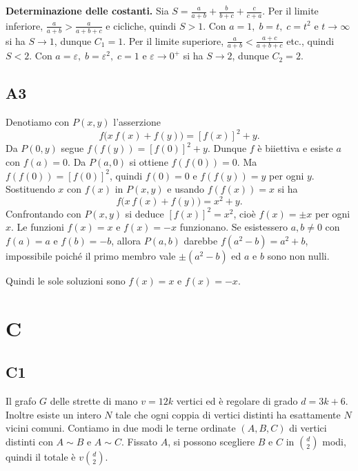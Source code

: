 \documentclass[11pt]{scrartcl}
\begin{document}
\textbf{Determinazione delle costanti.} Sia $S=\frac{a}{a+b}+\frac{b}{b+c}+\frac{c}{c+a}$.
Per il limite inferiore, $\frac{a}{a+b}>\frac{a}{a+b+c}$ e cicliche, quindi $S>1$.
Con $a=1,\;b=t,\;c=t^2$ e $t\to\infty$ si ha $S\to1$, dunque $C_1=1$.
Per il limite superiore, $\frac{a}{a+b}<\frac{a+c}{a+b+c}$ etc., quindi $S<2$.
Con $a=\varepsilon,\;b=\varepsilon^2,\;c=1$ e $\varepsilon\to0^+$ si ha $S\to2$, dunque $C_2=2$.



\subsection{A3}

Denotiamo con $P(x,y)$ l'asserzione
\[
f\bigl(x\,f(x)+f(y)\bigr)=[f(x)]^2+y.
\]
Da $P(0,y)$ segue $f(f(y))=[f(0)]^2+y$. Dunque $f$ è biiettiva e esiste $a$ con $f(a)=0$.
Da $P(a,0)$ si ottiene $f(f(0))=0$. Ma $f(f(0))=[f(0)]^2$, quindi $f(0)=0$ e $f(f(y))=y$ per ogni $y$.
Sostituendo $x$ con $f(x)$ in $P(x,y)$ e usando $f(f(x))=x$ si ha
\[
f\bigl(x\,f(x)+f(y)\bigr)=x^2+y.
\]
Confrontando con $P(x,y)$ si deduce $[f(x)]^2=x^2$, cioè $f(x)=\pm x$ per ogni $x$.
Le funzioni $f(x)=x$ e $f(x)=-x$ funzionano. Se esistessero $a,b\neq0$ con $f(a)=a$
e $f(b)=-b$, allora $P(a,b)$ darebbe $f(a^2-b)=a^2+b$, impossibile
poiché il primo membro vale $\pm(a^2-b)$ ed $a$ e $b$ sono non nulli.

Quindi le sole soluzioni sono $f(x)=x$ e $f(x)=-x$.


\section{C}

\subsection{C1}
Il grafo $G$ delle strette di mano $v=12k$ vertici ed è regolare di grado $d=3k+6$.
Inoltre esiste un intero $N$ tale che ogni coppia di vertici distinti
ha esattamente $N$ vicini comuni.
Contiamo in due modi le terne ordinate $(A,B,C)$ di vertici distinti con $A\sim B$ e $A\sim C$.
Fissato $A$, si possono scegliere $B$ e $C$ in $\binom{d}{2}$ modi,
quindi il totale è $v\binom{d}{2}$.
\end{document}

